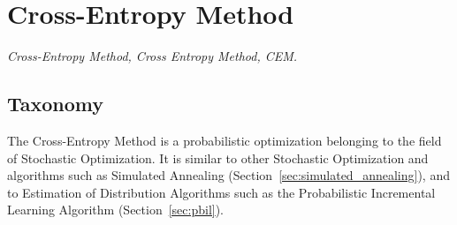 

\section{Cross-Entropy Method} 
\label{sec:cross_entropy}

\emph{Cross-Entropy Method, Cross Entropy Method, CEM.}

\subsection{Taxonomy}
The Cross-Entropy Method is a probabilistic optimization belonging to the field of Stochastic Optimization.
It is similar to other Stochastic Optimization and algorithms such as Simulated Annealing (Section~\ref{sec:simulated_annealing}), and to Estimation of Distribution Algorithms such as the Probabilistic Incremental Learning Algorithm (Section~\ref{sec:pbil}).

